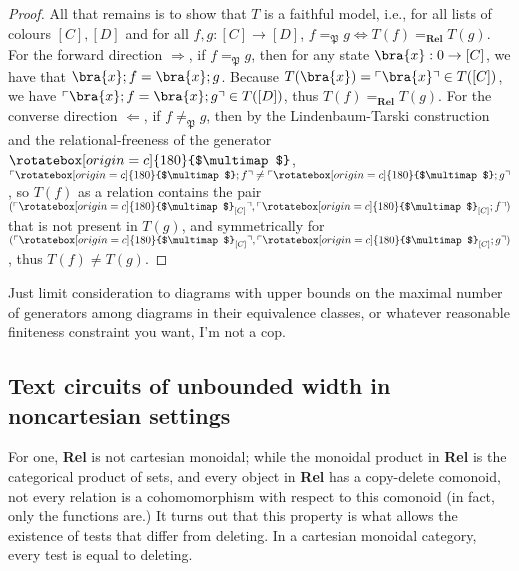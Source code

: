 \begin{fullwidth}
\begin{theorem}
\begin{proof}
All that remains is to show that $T$ is a faithful model, i.e., for all lists of colours $[C],[D]$ and for all $f,g : [C] \rightarrow [D]$, $f =_\mathfrak{P} g \iff T(f) =_\textbf{Rel} T(g)$. For the forward direction $\Rightarrow$, if $f =_\mathfrak{P} g$, then for any state $\bra{x} : 0 \rightarrow [C]$, we have that $\bra{x};f = \bra{x};g$. Because $T(\bra{x}) = \ulcorner \bra{x} \urcorner \in T([C])$, we have $\ulcorner \bra{x};f = \bra{x};g \urcorner \in T([D])$, thus $T(f) =_\textbf{Rel} T(g)$. For the converse direction $\Leftarrow$, if $f \neq_\mathfrak{P} g$, then by the Lindenbaum-Tarski construction and the relational-freeness of the generator $\rotatebox[origin=c]{180}{$\multimap$}$, $\ulcorner \rotatebox[origin=c]{180}{$\multimap$};f \urcorner \neq \ulcorner \rotatebox[origin=c]{180}{$\multimap$};g \urcorner$, so $T(f)$ as a relation contains the pair $(\ulcorner \rotatebox[origin=c]{180}{$\multimap$}_{[C]} \urcorner, \ulcorner \rotatebox[origin=c]{180}{$\multimap$}_{[C]};f \urcorner)$ that is not present in $T(g)$, and symmetrically for $(\ulcorner \rotatebox[origin=c]{180}{$\multimap$}_{[C]} \urcorner, \ulcorner \rotatebox[origin=c]{180}{$\multimap$}_{[C]};g \urcorner)$, thus $T(f) \neq T(g)$.
\end{proof}
\end{theorem}

\begin{corollary}
Just limit consideration to diagrams with upper bounds on the maximal number of generators among diagrams in their equivalence classes, or whatever reasonable finiteness constraint you want, I'm not a cop.
\end{corollary}

\subsection{Text circuits of unbounded width in noncartesian settings}

 For one, \textbf{Rel} is not cartesian monoidal; while the monoidal product in \textbf{Rel} is the categorical product of sets, and every object in \textbf{Rel} has a copy-delete comonoid, not every relation is a cohomomorphism with respect to this comonoid (in fact, only the functions are.) It turns out that this property is what allows the existence of tests that differ from deleting. In a cartesian monoidal category, every test is equal to deleting.


\end{fullwidth}
